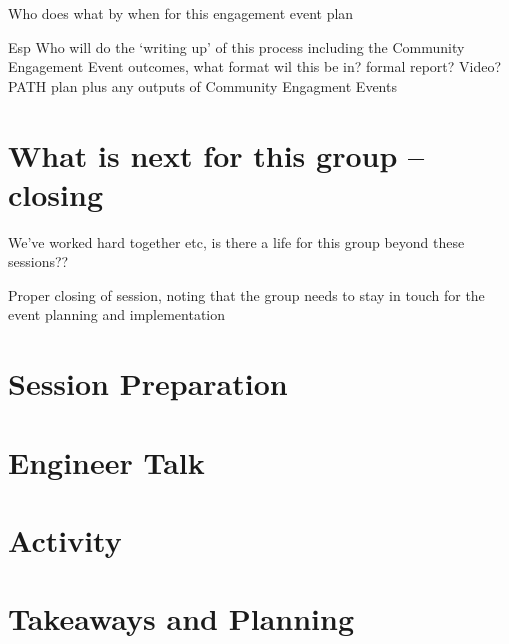 \documentclass[letterpaper,10pt,english]{jupyterBook}
\begin{document}
\sphinxAtStartPar
Who does what by when for this engagement event plan

\sphinxAtStartPar
Esp Who will do the ‘writing up’ of this process including the Community Engagement Event outcomes, what format wil this be in?  formal report?  Video? PATH plan plus any outputs of Community Engagment Events


\section{What is next for this group – closing}
\label{\detokenize{session4/session4:what-is-next-for-this-group-closing}}
\sphinxAtStartPar
We’ve worked hard together etc, is there a life for this group beyond these sessions??

\sphinxAtStartPar
Proper closing of session, noting that the group needs to stay in touch for the event planning and implementation

\sphinxstepscope


\section{Session Preparation}
\label{\detokenize{session4/details/preparation:session-preparation}}\label{\detokenize{session4/details/preparation::doc}}
\sphinxstepscope


\section{Engineer Talk}
\label{\detokenize{session4/details/session-concepts:engineer-talk}}\label{\detokenize{session4/details/session-concepts::doc}}
\sphinxstepscope


\section{Activity}
\label{\detokenize{session4/details/activity:activity}}\label{\detokenize{session4/details/activity::doc}}
\sphinxstepscope


\section{Takeaways and Planning}
\label{\detokenize{session4/details/takeaways-and-planning:takeaways-and-planning}}\label{\detokenize{session4/details/takeaways-and-planning::doc}}






\renewcommand{\indexname}{Index}
\printindex
\end{document}
